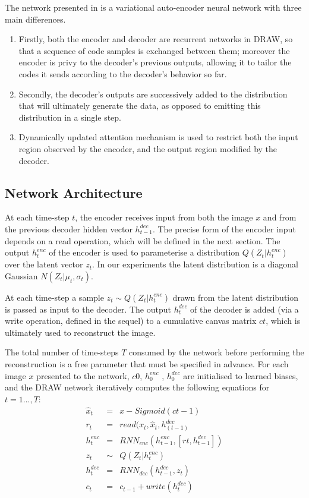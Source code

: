 \documentclass{scrartcl}
\begin{document}
The network presented in \cite{gregor2015draw} is a variational auto-encoder neural network with three main differences.
\begin{enumerate}
  \item {Firstly, both the encoder and decoder are recurrent networks in DRAW, so that a sequence
     of code samples is exchanged between them; moreover the encoder is privy to the decoder’s previous outputs, allowing
     it to tailor the codes it sends according to the decoder’s behavior so far.
     }

  \item {Secondly, the decoder’s outputs are successively added to the distribution that will ultimately generate
    the data, as opposed to emitting this distribution in a single step.
    }
  \item {Dynamically updated attention mechanism is used to restrict both the input region observed by the encoder,
    and the output region modified by the decoder.
    }

\end{enumerate}

\subsection{Network Architecture}

At each time-step $t$, the encoder receives input from both the image $x$ and from the previous decoder hidden vector $h^{dec}_{t−1}$.
The precise form of the encoder input depends on a read operation, which will be defined in the next section.  The output $h^{enc}_t$ of the encoder is used to parameterise a distribution $Q(Z_t|h^{enc}_t)$ over the latent vector $z_t$.
In our experiments the latent distribution is a diagonal Gaussian $N (Z_t|\mu_t, \sigma_t)$.

At each time-step a sample $z_t ∼ Q(Z_t|h^{enc}_t)$ drawn from the latent distribution is passed as input to the decoder.
The output $h^{dec}_t$ of the decoder is added (via a write operation, defined in the sequel) to a cumulative canvas matrix $ct$, which is ultimately used to reconstruct the image.

The total number of time-steps $T$ consumed by the network before performing the reconstruction is a free parameter that must be specified in advance.
For each image $x$ presented to the network, $c0$, $h^{enc}_0$ , $h^{dec}_0$ are initialised to learned biases, and the DRAW network iteratively computes the following equations for $t = 1 . . . , T:$
\begin{eqnarray}
  \hat{x}_t &=& x − Sigmoid(ct−1) \\
  r_t &=& read(x_t, \hat{x}_t, h^{dec}_{(t−1)} \label{read_op} \\
  h^{enc}_t &=& RNN_{enc}(h^{enc}_{t−1} , [rt, h^{dec}_{t−1}]) \\
  z_t &\sim& Q(Z_t|h^{enc}_t) \\
  h^{dec}_t &=& RNN_{dec}(h^{dec}_{t−1}, z_t) \\
  c_t &=& c_{t−1} + write(h^{dec}_t) \label{write_op}
\end{eqnarray}
\end{document}
